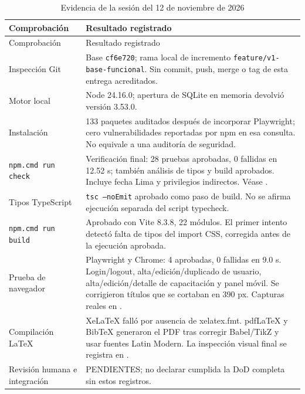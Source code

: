 \begin{longtable}{P{4.2cm}P{8.2cm}}
\caption{Evidencia de la sesión del 12 de noviembre de 2026}\label{tab:evidencia}\\
\toprule Comprobación & Resultado registrado \\ \midrule
\endfirsthead
\toprule Comprobación & Resultado registrado \\ \midrule
\endhead
Inspección Git & Base \texttt{cf6e720}; rama local de incremento \texttt{feature/v1-base-funcional}. Sin commit, push, merge o tag de esta entrega acreditados. \\
Motor local & Node 24.16.0; apertura de SQLite en memoria devolvió versión 3.53.0. \\
Instalación & 133 paquetes auditados después de incorporar Playwright; cero vulnerabilidades reportadas por npm en esa consulta. No equivale a una auditoría de seguridad. \\
\texttt{npm.cmd run check} & Verificación final: 28 pruebas aprobadas, 0 fallidas en 12.52 s; también análisis de tipos y build aprobados. Incluye fecha Lima y privilegios indirectos. Véase . \\
Tipos TypeScript & \texttt{tsc --noEmit} aprobado como paso de build. No se afirma ejecución separada del script typecheck. \\
\texttt{npm.cmd run build} & Aprobado con Vite 8.3.8, 22 módulos. El primer intento detectó falta de tipos del import CSS, corregida antes de la ejecución aprobada. \\
Prueba de navegador & Playwright y Chrome: 4 aprobadas, 0 fallidas en 9.0 s. Login/logout, alta/edición/duplicado de usuario, alta/edición/detalle de capacitación y panel móvil. Se corrigieron títulos que se cortaban en 390 px. Capturas reales en . \\
Compilación LaTeX & XeLaTeX falló por ausencia de xelatex.fmt. pdfLaTeX y BibTeX generaron el PDF tras corregir Babel/TikZ y usar fuentes Latin Modern. La inspección visual final se registra en . \\
Revisión humana e integración & PENDIENTES; no declarar cumplida la DoD completa sin estos registros. \\
\bottomrule
\end{longtable}
